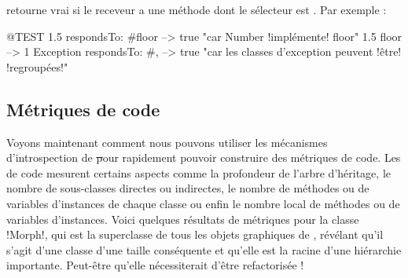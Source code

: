 \documentclass[a4paper,10pt,twoside]{book}
\begin{document}
 retourne vrai si le receveur a une méthode dont le sélecteur est .
Par exemple :
\begin{code}{@TEST}
1.5 respondsTo: #floor      --> true    "car Number !implémente! floor"
1.5 floor                            --> 1
Exception respondsTo: #, --> true    "car les classes d'exception peuvent !être! !regroupées!"
\end{code}



\subsection{Métriques de code}

Voyons maintenant comment nous pouvons utiliser les mécanismes d'introspection de \st pour rapidement pouvoir construire des métriques de code. Les  de code mesurent certains aspects comme la profondeur de l'arbre d'héritage, le nombre de sous-classes directes ou indirectes, le nombre de méthodes ou de variables d'instances de chaque classe ou enfin le nombre local de méthodes ou de variables d'instances.
Voici quelques résultats de métriques pour la classe \ct!Morph!, qui est la superclasse de tous les objets graphiques de \pharo, révélant qu'il s'agit d'une classe d'une taille conséquente et qu'elle est la racine d'une hiérarchie importante. Peut-être qu'elle nécessiterait d'être refactorisée !
\end{document}

